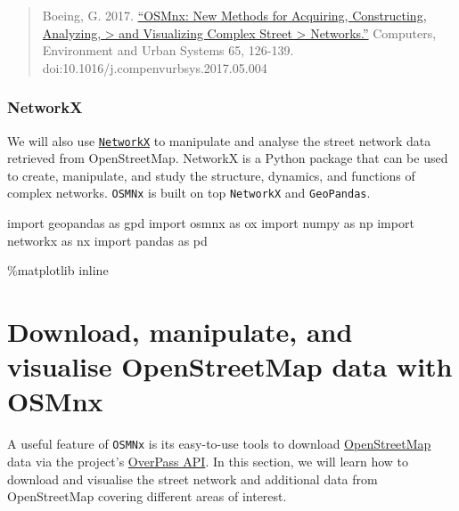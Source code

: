 \documentclass[
  letterpaper,
  DIV=11,
  numbers=noendperiod]{scrreprt}
\newenvironment{Shaded}{\begin{snugshade}}{\end{snugshade}}
\newcommand{\ImportTok}[1]{\textcolor[rgb]{0.00,0.46,0.62}{#1}}
\newcommand{\NormalTok}[1]{\textcolor[rgb]{0.00,0.23,0.31}{#1}}
\newcommand{\OperatorTok}[1]{\textcolor[rgb]{0.37,0.37,0.37}{#1}}
\begin{document}
\begin{quote}
Boeing, G. 2017.
\href{https://www.researchgate.net/publication/309738462_OSMnx_New_Methods_for_Acquiring_Constructing_Analyzing_and_Visualizing_Complex_Street_Networks}{``OSMnx:
New Methods for Acquiring, Constructing, Analyzing, \textgreater{} and
Visualizing Complex Street \textgreater{} Networks.''} Computers,
Environment and Urban Systems 65, 126-139.
doi:10.1016/j.compenvurbsys.2017.05.004
\end{quote}

\subsubsection{NetworkX}\label{networkx}

We will also use
\href{https://networkx.github.io/documentation//}{\texttt{NetworkX}} to
manipulate and analyse the street network data retrieved from
OpenStreetMap. NetworkX is a Python package that can be used to create,
manipulate, and study the structure, dynamics, and functions of complex
networks. \texttt{OSMNx} is built on top \texttt{NetworkX} and
\texttt{GeoPandas}.

\begin{Shaded}
\begin{Highlighting}[]
\ImportTok{import}\NormalTok{ geopandas }\ImportTok{as}\NormalTok{ gpd}
\ImportTok{import}\NormalTok{ osmnx }\ImportTok{as}\NormalTok{ ox}
\ImportTok{import}\NormalTok{ numpy }\ImportTok{as}\NormalTok{ np}
\ImportTok{import}\NormalTok{ networkx }\ImportTok{as}\NormalTok{ nx}
\ImportTok{import}\NormalTok{ pandas }\ImportTok{as}\NormalTok{ pd}

\OperatorTok{\%}\NormalTok{matplotlib inline}
\end{Highlighting}
\end{Shaded}

\section{Download, manipulate, and visualise OpenStreetMap data with
OSMnx}\label{download-manipulate-and-visualise-openstreetmap-data-with-osmnx}

A useful feature of \texttt{OSMNx} is its easy-to-use tools to download
\href{http://www.openstreetmap.org}{OpenStreetMap} data via the
project's
\href{http://wiki.openstreetmap.org/wiki/Overpass_API}{OverPass API}. In
this section, we will learn how to download and visualise the street
network and additional data from OpenStreetMap covering different areas
of interest.
\end{document}
